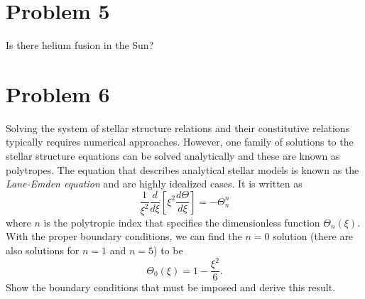\documentclass[12pt]{article}
\begin{document}
\section*{Problem 5}
Is there helium fusion in the Sun?


\section*{Problem 6}
Solving the system of stellar structure relations and their constitutive relations typically requires numerical approaches. However, one family of solutions to the stellar structure equations can be solved analytically and these are known as polytropes. The equation that describes analytical stellar models is known as the \textit{Lane-Emden equation} and are highly idealized cases. It is written as
\begin{equation}
\frac{1}{\xi^2}\frac{d}{d\xi}\left[\xi^2 \frac{d\Theta}{d\xi}\right] = -\Theta_n^n
\end{equation}
where $n$ is the polytropic index that specifies the dimensionless function $\Theta_n (\xi)$. With the proper boundary conditions, we can find the $n=0$ solution (there are also solutions for $n=1$ and $n=5$) to be
\begin{equation}
\Theta_0(\xi) = 1-\frac{\xi^2}{6}.
\end{equation}
Show the boundary conditions that must be imposed and derive this result.
\end{document}
